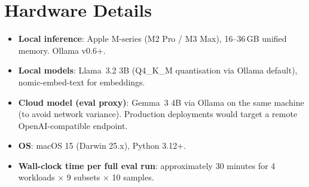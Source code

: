\documentclass[11pt,a4paper]{article}
\begin{document}
\section{Hardware Details}
\label{app:hardware}

\begin{itemize}
  \item \textbf{Local inference}: Apple M-series (M2 Pro / M3 Max),
    16--36\,GB unified memory. Ollama v0.6+.
  \item \textbf{Local models}: Llama~3.2 3B (Q4\_K\_M quantisation
    via Ollama default), nomic-embed-text for embeddings.
  \item \textbf{Cloud model (eval proxy)}: Gemma~3 4B via Ollama
    on the same machine (to avoid network variance). Production
    deployments would target a remote OpenAI-compatible endpoint.
  \item \textbf{OS}: macOS 15 (Darwin 25.x), Python 3.12+.
  \item \textbf{Wall-clock time per full eval run}: approximately
    30 minutes for 4 workloads $\times$ 9 subsets $\times$ 10 samples.
\end{itemize}



\end{document}

